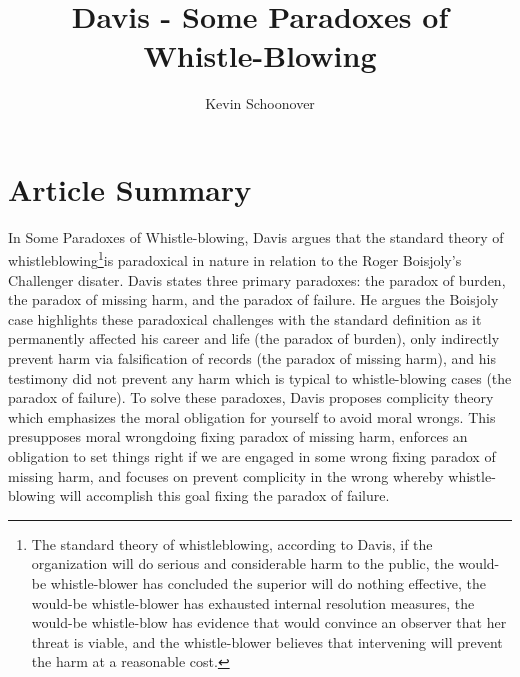 \documentclass[12pt]{article}
\begin{document}
\title{Davis - Some Paradoxes of Whistle-Blowing}
\author{Kevin Schoonover}

\maketitle

\section{Article Summary}
In Some Paradoxes of Whistle-blowing, Davis argues that the standard theory of
whistleblowing\footnote{The standard theory of whistleblowing, according to
Davis, if the organization will do serious and considerable harm to the public,
the would-be whistle-blower has concluded the superior will do nothing
effective, the would-be whistle-blower has exhausted internal resolution
measures, the would-be whistle-blow has evidence that would convince an observer
that her threat is viable, and the whistle-blower believes that intervening will
prevent the harm at a reasonable cost.}is paradoxical in nature in relation to
the Roger Boisjoly's Challenger disater. Davis states
three primary paradoxes: the paradox of burden, the paradox of missing harm,
and the paradox of failure. He argues the Boisjoly case highlights these
paradoxical challenges with the standard definition as it permanently affected
his career and life (the paradox of burden), only indirectly prevent harm via
falsification of records (the paradox of missing harm), and his testimony did
not prevent any harm which is typical to whistle-blowing cases (the paradox of
failure). To solve these paradoxes, Davis proposes complicity theory which
emphasizes the moral obligation for yourself to avoid moral wrongs. This
presupposes moral wrongdoing fixing paradox of missing harm, enforces an
obligation to set things right if we are engaged in some wrong fixing paradox of
missing harm, and focuses on prevent complicity in the wrong whereby
whistle-blowing will accomplish this goal fixing the paradox of failure.
\end{document}
